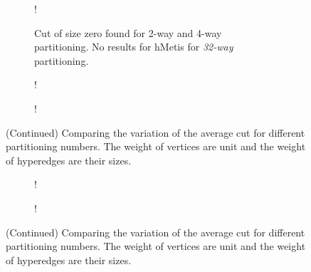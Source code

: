 \documentclass[twocolumn]{svjour3}          \smartqed
\begin{document}
\begin{figure}[t]
	\centering
    \ContinuedFloat 

	\begin{subfigure}{0.45\textwidth}
		\centering
		\captionsetup{font=small,labelfont=bf}
		\resizebox {\textwidth} {!} {
		}
	\caption{Cut of size zero found for {2-way} and {4-way} partitioning. No results for {hMetis} for \textit{32-way} partitioning.}
	\end{subfigure}

	\begin{subfigure}{0.45\textwidth}
		\centering
		\captionsetup{font=small,labelfont=bf}
		\resizebox {\textwidth} {!} {
	}
	\caption{}
	\end{subfigure}

	\begin{subfigure}{0.45\textwidth}
		\centering
		\captionsetup{font=small,labelfont=bf}
		\resizebox {\textwidth} {!} {
	}
	\caption{}
	\end{subfigure}

\caption{(Continued) Comparing the variation of the average cut for different partitioning numbers. The weight of vertices are unit and the weight of hyperedges are their sizes.}
\end{figure}



\begin{figure}[t]
	\centering
    \ContinuedFloat 

	\begin{subfigure}{0.45\textwidth}
		\centering
		\captionsetup{font=small,labelfont=bf}
		\resizebox {\textwidth} {!} {
		}
	\caption{}
	\end{subfigure}
	
	\begin{subfigure}{0.45\textwidth}
		\centering
		\captionsetup{font=small,labelfont=bf}
		\resizebox {\textwidth} {!} {
	}
	\caption{}
	\end{subfigure}

\caption{(Continued) Comparing the variation of the average cut for different partitioning numbers. The weight of vertices are unit and the weight of hyperedges are their sizes.}
\end{figure}
\end{document}
